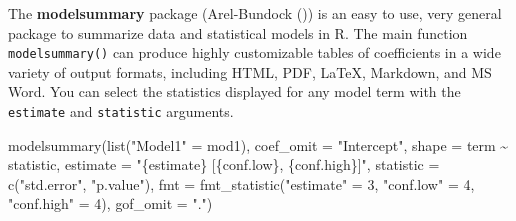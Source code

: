 \documentclass[
  letterpaper,
  10pt,
  krantz2]{krantz}
\makeatletter
\newenvironment{Shaded}{\begin{snugshade}}{\end{snugshade}}
\newcommand{\AttributeTok}[1]{\textcolor[rgb]{0.40,0.45,0.13}{#1}}
\newcommand{\DecValTok}[1]{\textcolor[rgb]{0.68,0.00,0.00}{#1}}
\newcommand{\FunctionTok}[1]{\textcolor[rgb]{0.28,0.35,0.67}{#1}}
\newcommand{\NormalTok}[1]{\textcolor[rgb]{0.00,0.23,0.31}{#1}}
\newcommand{\OtherTok}[1]{\textcolor[rgb]{0.00,0.23,0.31}{#1}}
\newcommand{\SpecialCharTok}[1]{\textcolor[rgb]{0.37,0.37,0.37}{#1}}
\newcommand{\StringTok}[1]{\textcolor[rgb]{0.13,0.47,0.30}{#1}}
\newenvironment{kframe}{%
  \medskip{}
  \setlength{\fboxsep}{.8em}
  \def\at@end@of@kframe{}%
  \ifinner\ifhmode%
  \def\at@end@of@kframe{\end{minipage}}%
  \begin{minipage}{\columnwidth}%
  \fi\fi%
  \def\FrameCommand##1{\hskip\@totalleftmargin \hskip-\fboxsep
  \colorbox{shadecolor}{##1}\hskip-\fboxsep
      \hskip-\linewidth \hskip-\@totalleftmargin \hskip\columnwidth}%
  \MakeFramed {\advance\hsize-\width
    \@totalleftmargin\z@ \linewidth\hsize
    \@setminipage}}%
{\par\unskip\endMakeFramed%
  \at@end@of@kframe}
\renewenvironment{Shaded}{\begin{kframe}}{\end{kframe}}
\makeatother
\begin{document}
The \textbf{modelsummary} package (Arel-Bundock
()) is an easy to use, very general
package to summarize data and statistical models in R. The main function
\texttt{modelsummary()} can produce highly customizable tables of
coefficients in a wide variety of output formats, including HTML, PDF,
LaTeX, Markdown, and MS Word. You can select the statistics displayed
for any model term with the \texttt{estimate} and \texttt{statistic}
arguments.

\begin{Shaded}
\begin{Highlighting}[]
\FunctionTok{modelsummary}\NormalTok{(}\FunctionTok{list}\NormalTok{(}\StringTok{"Model1"} \OtherTok{=}\NormalTok{ mod1),}
  \AttributeTok{coef\_omit =} \StringTok{"Intercept"}\NormalTok{,}
  \AttributeTok{shape =}\NormalTok{ term }\SpecialCharTok{\textasciitilde{}}\NormalTok{ statistic,}
  \AttributeTok{estimate =} \StringTok{"\{estimate\} [\{conf.low\}, \{conf.high\}]"}\NormalTok{,}
  \AttributeTok{statistic =} \FunctionTok{c}\NormalTok{(}\StringTok{"std.error"}\NormalTok{, }\StringTok{"p.value"}\NormalTok{),}
  \AttributeTok{fmt =} \FunctionTok{fmt\_statistic}\NormalTok{(}\StringTok{"estimate"} \OtherTok{=} \DecValTok{3}\NormalTok{, }\StringTok{"conf.low"} \OtherTok{=} \DecValTok{4}\NormalTok{, }\StringTok{"conf.high"} \OtherTok{=} \DecValTok{4}\NormalTok{),}
  \AttributeTok{gof\_omit =} \StringTok{"."}\NormalTok{)}
\end{Highlighting}
\end{Shaded}

\begin{table}

\caption{\label{tbl-modelsummary1}Table of coefficients for the main
effects model.}


\end{table}%
\end{document}
